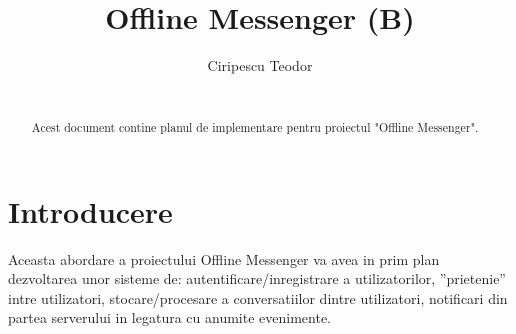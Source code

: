 \documentclass[runningheads]{llncs}
\begin{document}
\title{Offline Messenger (B)}
%
%
\author{Ciripescu Teodor\\
\\}
%
%
%
\maketitle              %
%
\begin{abstract}
Acest document contine planul de implementare pentru proiectul "Offline Messenger".

\end{abstract}
%
%
%
\section{Introducere}
Aceasta abordare a proiectului Offline Messenger va avea in prim plan dezvoltarea unor sisteme de: autentificare/inregistrare a utilizatorilor, ”prietenie” intre utilizatori, stocare/procesare a conversatiilor dintre utilizatori, notificari din partea serverului in legatura cu anumite evenimente.\\
\end{document}
